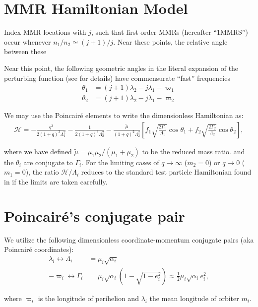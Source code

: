 \documentclass[11pt]{article}
\begin{document}
\section{MMR Hamiltonian Model}
\label{sec:orgd7eca4a}
Index MMR locations with \(j\), such that first order MMRs (hereafter ``1MMRS'') occur whenever
\(n_1/n_2\simeq(j+1)/j\).
Near these points, the relative angle between these 

Near this point, the following geometric angles in the literal expansion of the perturbing
function (see \cite{murray_solar_2000} for details) have commensurate ``fast'' frequencies
\begin{align}
\theta_1 &= (j+1)\lambda_2-j\lambda_1-\varpi_1\\
\theta_2 &= (j+1)\lambda_2-j\lambda_1-\varpi_2
\end{align}


We may use the Poincair\'e elements to write
the dimensionless Hamiltonian as:
\begin{align}
\label{eq:H_1}
  \mathcal{H}
  = -\frac{q^3}{2(1+q)^3 \Lambda_1^2}
    - \frac{1}{2(1+q)^3\Lambda_2^2}
   - \frac{\tilde\mu}{(1+q)^2 \Lambda_2^2}\left[
    f_1\sqrt{\frac{2\Gamma_1}{\Lambda_1}}\cos\theta_1
    +f_2\sqrt{\frac{2\Gamma_2}{\Lambda_2}}\cos\theta_2
    \right],
\end{align}

\noindent where we have defined
\(\tilde\mu=\mu_1\mu_2/(\mu_1+\mu_2)\) to be the reduced mass ratio.
and the \(\theta_i\) are conjugate to \(\Gamma_i\).  For the limiting
cases of \(q\to \infty\) (\(m_2=0\)) or \(q\to 0\) (\(m_1=0\)), the ratio
\(\mathcal{H}/\Lambda_i\) reduces to the standard test particle
Hamiltonian found in \cite{murray_solar_2000} if the limits are taken
carefully.

\section{Poincair\'e's conjugate pair}
\label{sec:org71b92c1}
We utilize the following dimensionless coordinate-momentum conjugate
pairs (aka Poincair\'e coordinates):
\begin{align}
  \lambda_i \longleftrightarrow\Lambda_i &= \mu_i\sqrt{\alpha_i} \\
  -\varpi_i \longleftrightarrow\Gamma_i &= \mu_i\sqrt{\alpha_i}(1-\sqrt{1-e_i^2}) \approx \frac12\mu_i\sqrt{\alpha_i}e_i^2,
\end{align}

\noindent
where \(\varpi_i\) is the longitude of perihelion and \(\lambda_i\) the mean longitude
of orbiter \(m_i\).
\end{document}
